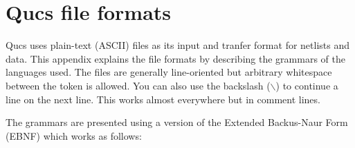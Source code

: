 %
%
%
%

\chapter{Qucs file formats}
\label{sec:qucsfiles}

%
%
\newcommand\tok[1]{`{\bf #1}'}  %
\newcommand\ntok[1]{{\bf #1}}   %
\newcommand\bsl[1]{\tok{$\backslash$#1}}
\newenvironment{grammar}%
  {\newcommand\produces[2]{##1 \> $\rightarrow$ \> ##2 \\}
   \newcommand\orproduces[1]{\> \> \makebox[0pt][r]{$|$ }##1 \\}
   \newcommand\opt[1]{[ ##1 ]}
   \newcommand\rep[1]{\{ ##1 \}}
   \newcommand\alt[0]{$|$}
   \newcommand\group[1]{( ##1 )}
   \newcommand\emptyprod{{$\varepsilon$}}
   \newcommand\heading[1]{\rule{\linewidth}{1pt} \\{\bf ##1}\\[2ex]}
   \newcommand\separator{\rule{\linewidth}{1pt} \\}
   \begin{tabbing}
   \qquad\qquad\qquad\qquad \= \qquad \= \kill}
  {\end{tabbing}}

\def\REalpha{\tok{a} \alt{}~\dots~\alt{} \tok{z} \alt{}
             \tok{A} \alt{}~\dots~\alt{} \tok{Z}}
\def\REalnum{\REalpha \alt{} \tok{0}~\dots~\tok{9} \alt{} \tok{\_}}
\def\REplusminus{\opt{\tok{+} \alt{} \tok{-}}}

%
%
Qucs uses plain-text (ASCII) files as its input and tranfer format for
netlists and data. This appendix explains the file formats by
describing the grammars of the languages used. The files are generally
line-oriented but arbitrary whitespace between the token is
allowed. You can also use the backslash ($\backslash$) to continue a
line on the next line. This works almost everywhere but in
comment lines.

The grammars are presented using a version of the Extended Backus-Naur
Form (EBNF) which works as follows:

